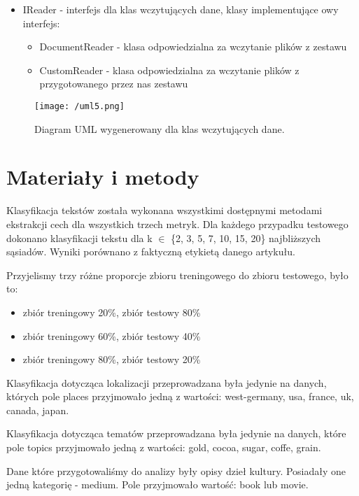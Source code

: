 \documentclass{classrep}
\begin{document}
\begin{itemize}[label=$\bullet$]
\item IReader - interfejs dla klas wczytujących dane, klasy implementujące owy interfejs:
\begin{itemize}
\item DocumentReader -  klasa odpowiedzialna za wczytanie plików z zestawu \cite{data}
\item CustomReader -  klasa odpowiedzialna za wczytanie plików z przygotowanego przez nas zestawu \cite{our}
\end{itemize}
\end{itemize}

\begin{figure}[H]
	\centering
	\texttt{[image: /uml5.png]}
	\caption{Diagram UML wygenerowany dla klas wczytujących dane.}
\end{figure}

\section{Materiały i metody}
Klasyfikacja tekstów została wykonana wszystkimi dostępnymi metodami ekstrakcji cech dla wszystkich trzech metryk. Dla każdego przypadku testowego dokonano klasyfikacji tekstu dla k $\in$ \{2, 3, 5, 7, 10, 15, 20\} najbliższych sąsiadów. Wyniki porównano z faktyczną etykietą danego artykułu. \newline

Przyjelismy trzy różne proporcje zbioru treningowego do zbioru testowego, było to:
\begin{itemize}
\item zbiór treningowy 20\%, zbiór testowy 80\%
\item zbiór treningowy 60\%, zbiór testowy 40\%
\item zbiór treningowy 80\%, zbiór testowy 20\%
\end{itemize}

Klasyfikacja dotycząca lokalizacji przeprowadzana była jedynie na danych, których pole places przyjmowało jedną z wartości: west-germany, usa, france, uk, canada, japan.
\newline

Klasyfikacja dotycząca tematów przeprowadzana była jedynie na danych, które pole topics przyjmowało jedną z wartości: gold, cocoa, sugar, coffe, grain.\newline

Dane które przygotowaliśmy do analizy były opisy dzieł kultury. Posiadały one jedną kategorię - medium. Pole przyjmowało wartość: book lub movie.
\end{document}
